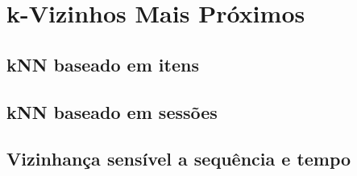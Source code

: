 \section{k-Vizinhos Mais Próximos}
\subsection{kNN baseado em itens}
\subsection{kNN baseado em sessões}
\subsection{Vizinhança sensível a sequência e tempo}
\cite{alencar2009}
